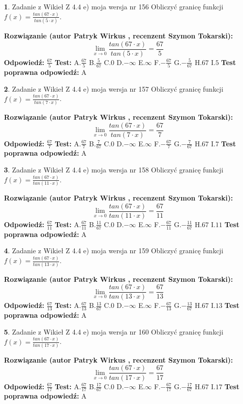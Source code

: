 \documentclass[12pt, a4paper]{article}
\theoremstyle{definition} %
\newtheorem{zad}{}
\newcommand{\zadStart}[1]{\begin{zad}#1\newline}
\newcommand{\zadStop}{\end{zad}}
\newcommand{\rozwStart}[2]{\noindent \textbf{Rozwiązanie (autor #1 , recenzent #2): }\newline}
\newcommand{\rozwStop}{\newline}
\newcommand{\odpStart}{\noindent \textbf{Odpowiedź:}\newline}
\newcommand{\odpStop}{\newline}
\newcommand{\testStart}{\noindent \textbf{Test:}\newline}
\newcommand{\testStop}{\newline}
\newcommand{\kluczStart}{\noindent \textbf{Test poprawna odpowiedź:}\newline}
\newcommand{\kluczStop}{\newline}
\begin{document}
\zadStart{Zadanie z Wikieł Z 4.4 e) moja wersja nr 156}
Obliczyć granicę funkcji $f(x)=\frac{tan(67\cdot x)}{tan(5\cdot x)}$.
\zadStop
\rozwStart{Patryk Wirkus}{Szymon Tokarski}
$$\lim\limits_{x\to 0}\frac{tan(67\cdot x)}{tan(5\cdot x)}=
\frac{67}{5}$$
\rozwStop
\odpStart
$\frac{67}{5}$
\odpStop
\testStart
A.$\frac{67}{5}$
B.$\frac{5}{67}$
C.$0$
D.$-\infty$
E.$\infty$
F.$-\frac{67}{5}$
G.$-\frac{5}{67}$
H.$67$
I.$5$
\testStop
\kluczStart
A
\kluczStop



\zadStart{Zadanie z Wikieł Z 4.4 e) moja wersja nr 157}
Obliczyć granicę funkcji $f(x)=\frac{tan(67\cdot x)}{tan(7\cdot x)}$.
\zadStop
\rozwStart{Patryk Wirkus}{Szymon Tokarski}
$$\lim\limits_{x\to 0}\frac{tan(67\cdot x)}{tan(7\cdot x)}=
\frac{67}{7}$$
\rozwStop
\odpStart
$\frac{67}{7}$
\odpStop
\testStart
A.$\frac{67}{7}$
B.$\frac{7}{67}$
C.$0$
D.$-\infty$
E.$\infty$
F.$-\frac{67}{7}$
G.$-\frac{7}{67}$
H.$67$
I.$7$
\testStop
\kluczStart
A
\kluczStop



\zadStart{Zadanie z Wikieł Z 4.4 e) moja wersja nr 158}
Obliczyć granicę funkcji $f(x)=\frac{tan(67\cdot x)}{tan(11\cdot x)}$.
\zadStop
\rozwStart{Patryk Wirkus}{Szymon Tokarski}
$$\lim\limits_{x\to 0}\frac{tan(67\cdot x)}{tan(11\cdot x)}=
\frac{67}{11}$$
\rozwStop
\odpStart
$\frac{67}{11}$
\odpStop
\testStart
A.$\frac{67}{11}$
B.$\frac{11}{67}$
C.$0$
D.$-\infty$
E.$\infty$
F.$-\frac{67}{11}$
G.$-\frac{11}{67}$
H.$67$
I.$11$
\testStop
\kluczStart
A
\kluczStop



\zadStart{Zadanie z Wikieł Z 4.4 e) moja wersja nr 159}
Obliczyć granicę funkcji $f(x)=\frac{tan(67\cdot x)}{tan(13\cdot x)}$.
\zadStop
\rozwStart{Patryk Wirkus}{Szymon Tokarski}
$$\lim\limits_{x\to 0}\frac{tan(67\cdot x)}{tan(13\cdot x)}=
\frac{67}{13}$$
\rozwStop
\odpStart
$\frac{67}{13}$
\odpStop
\testStart
A.$\frac{67}{13}$
B.$\frac{13}{67}$
C.$0$
D.$-\infty$
E.$\infty$
F.$-\frac{67}{13}$
G.$-\frac{13}{67}$
H.$67$
I.$13$
\testStop
\kluczStart
A
\kluczStop



\zadStart{Zadanie z Wikieł Z 4.4 e) moja wersja nr 160}
Obliczyć granicę funkcji $f(x)=\frac{tan(67\cdot x)}{tan(17\cdot x)}$.
\zadStop
\rozwStart{Patryk Wirkus}{Szymon Tokarski}
$$\lim\limits_{x\to 0}\frac{tan(67\cdot x)}{tan(17\cdot x)}=
\frac{67}{17}$$
\rozwStop
\odpStart
$\frac{67}{17}$
\odpStop
\testStart
A.$\frac{67}{17}$
B.$\frac{17}{67}$
C.$0$
D.$-\infty$
E.$\infty$
F.$-\frac{67}{17}$
G.$-\frac{17}{67}$
H.$67$
I.$17$
\testStop
\kluczStart
A
\kluczStop
\end{document}

